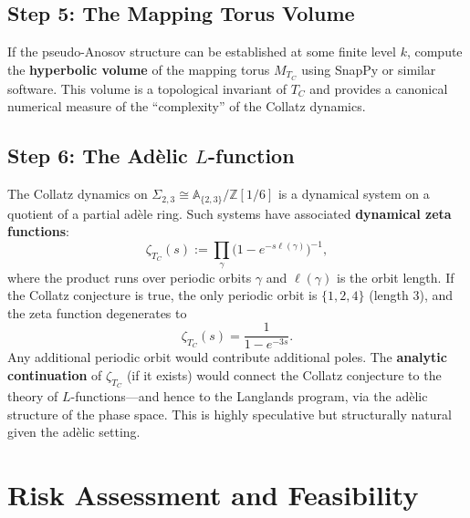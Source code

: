 \documentclass[11pt,a4paper]{article}
\newcommand{\Z}{\mathbb{Z}}
\newcommand{\A}{\mathbb{A}}
\theoremstyle{plain}
\theoremstyle{definition}
\begin{document}
\subsection{Step 5: The Mapping Torus Volume}

\begin{nextstep}
If the pseudo-Anosov structure can be established at some finite level $k$, compute the \textbf{hyperbolic volume} of the mapping torus $M_{T_C}$ using SnapPy or similar software. This volume is a topological invariant of $T_C$ and provides a canonical numerical measure of the ``complexity'' of the Collatz dynamics.
\end{nextstep}


\subsection{Step 6: The Adèlic $L$-function}

\begin{nextstep}
The Collatz dynamics on $\Sigma_{2,3} \cong \A_{\{2,3\}}/\Z[1/6]$ is a dynamical system on a quotient of a partial ad\`ele ring. Such systems have associated \textbf{dynamical zeta functions}:
\begin{equation}\label{eq:dyn-zeta}
    \zeta_{T_C}(s) := \prod_{\gamma} \bigl(1 - e^{-s \ell(\gamma)}\bigr)^{-1},
\end{equation}
where the product runs over periodic orbits $\gamma$ and $\ell(\gamma)$ is the orbit length. If the Collatz conjecture is true, the only periodic orbit is $\{1, 2, 4\}$ (length $3$), and the zeta function degenerates to
\begin{equation}
    \zeta_{T_C}(s) = \frac{1}{1 - e^{-3s}}.
\end{equation}
Any additional periodic orbit would contribute additional poles. The \textbf{analytic continuation} of $\zeta_{T_C}$ (if it exists) would connect the Collatz conjecture to the theory of $L$-functions---and hence to the Langlands program, via the ad\`elic structure of the phase space. This is highly speculative but structurally natural given the ad\`elic setting.
\end{nextstep}


\section{Risk Assessment and Feasibility}\label{sec:risk}
\end{document}
